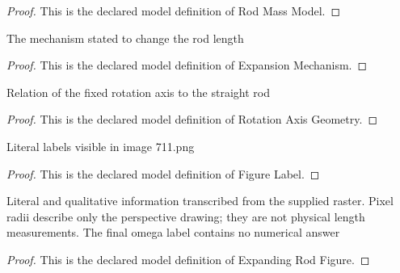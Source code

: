 \begin{proof}
  This is the declared model definition of Rod Mass Model.
\end{proof}
\begin{definition}
  \label{def:physics:phyx-mini-0711:phyxminiproblems-problemphyxmini0711-expansionmechanism}
  The mechanism stated to change the rod length
\end{definition}
\begin{proof}
  This is the declared model definition of Expansion Mechanism.
\end{proof}
\begin{definition}
  \label{def:physics:phyx-mini-0711:phyxminiproblems-problemphyxmini0711-rotationaxisgeometry}
  Relation of the fixed rotation axis to the straight rod
\end{definition}
\begin{proof}
  This is the declared model definition of Rotation Axis Geometry.
\end{proof}
\begin{definition}
  \label{def:physics:phyx-mini-0711:phyxminiproblems-problemphyxmini0711-figurelabel}
  Literal labels visible in image 711.png
\end{definition}
\begin{proof}
  This is the declared model definition of Figure Label.
\end{proof}
\begin{definition}
  \label{def:physics:phyx-mini-0711:phyxminiproblems-problemphyxmini0711-expandingrodfigure}
  Literal and qualitative information transcribed from the supplied raster. Pixel radii describe only the perspective drawing; they are not physical length measurements. The final omega label contains no numerical answer
\end{definition}
\begin{proof}
  This is the declared model definition of Expanding Rod Figure.
\end{proof}
